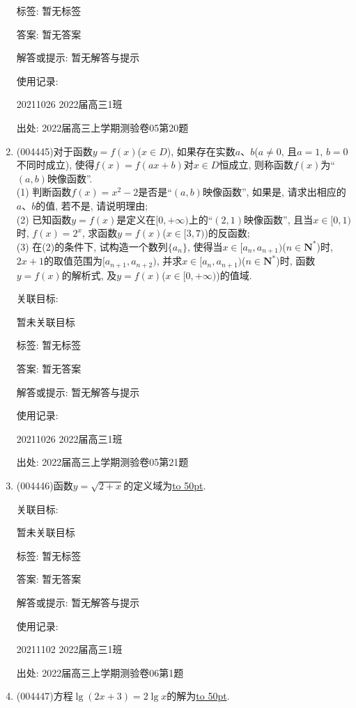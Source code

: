 \documentclass[10pt,a4paper]{article}
\newcommand{\blank}[1]{\underline{\hbox to #1pt{}}}
\begin{document}
\begin{enumerate}[1.]
标签: 暂无标签

答案: 暂无答案

解答或提示: 暂无解答与提示

使用记录:

20211026	2022届高三1班			


出处: 2022届高三上学期测验卷05第20题
\item { (004445)}对于函数$y=f(x)$($x\in D$), 如果存在实数$a$、$b$($a\ne 0$, 且$a=1$, $b=0$不同时成立), 使得$f(x)=f(ax+b)$对$x\in D$恒成立, 则称函数$f(x)$为``$(a,b)$映像函数''.\\
(1) 判断函数$f(x)=x^2-2$是否是``$(a,b)$映像函数'', 如果是, 请求出相应的$a$、$b$的值, 若不是, 请说明理由;\\
(2) 已知函数$y=f(x)$是定义在$[0,+\infty)$上的``$(2,1)$映像函数'', 且当$x\in [0,1)$时, $f(x)=2^x$, 求函数$y=f(x)$($x\in [3,7)$)的反函数;\\
(3) 在(2)的条件下, 试构造一个数列$\{a_n\}$, 使得当$x\in [a_n,{a_{n+1}})$($n\in \mathbf{N}^*$)时, $2x+1$的取值范围为$[{a_{n+1}},{a_{n+2}})$, 并求$x\in [a_n,{a_{n+1}})$($n\in \mathbf{N}^*$)时, 函数$y=f(x)$的解析式, 及$y=f(x)$($x\in [0,+\infty)$)的值域.


关联目标:

暂未关联目标



标签: 暂无标签

答案: 暂无答案

解答或提示: 暂无解答与提示

使用记录:

20211026	2022届高三1班			


出处: 2022届高三上学期测验卷05第21题
\item { (004446)}函数$y=\sqrt{2+x}$的定义域为\blank{50}.


关联目标:

暂未关联目标



标签: 暂无标签

答案: 暂无答案

解答或提示: 暂无解答与提示

使用记录:

20211102	2022届高三1班	


出处: 2022届高三上学期测验卷06第1题
\item { (004447)}方程$\lg(2x+3)=2\lg x$的解为\blank{50}.



\end{enumerate}
\end{document}
